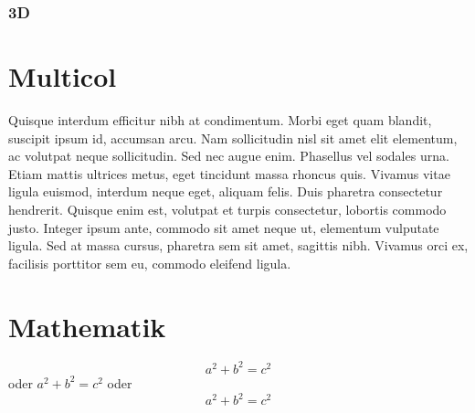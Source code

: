 \documentclass[a4paper, ngerman, oneside, 10pt]{article}
\begin{document}


\subsubsection{3D}

\newpage
\section{Multicol}
\begin{multicols}{2}
	Quisque interdum efficitur nibh at condimentum. Morbi eget quam blandit, suscipit ipsum id, accumsan arcu. Nam sollicitudin nisl sit amet elit elementum, ac volutpat neque sollicitudin. Sed nec augue enim. Phasellus vel sodales urna. Etiam mattis ultrices metus, eget tincidunt massa rhoncus quis. Vivamus vitae ligula euismod, interdum neque eget, aliquam felis. Duis pharetra consectetur hendrerit. Quisque enim est, volutpat et turpis consectetur, lobortis commodo justo. Integer ipsum ante, commodo sit amet neque ut, elementum vulputate ligula. Sed at massa cursus, pharetra sem sit amet, sagittis nibh. Vivamus orci ex, facilisis porttitor sem eu, commodo eleifend ligula.
\end{multicols}

\section{Mathematik}
\begin{equation}
	a^{2}+b^{2}=c^{2}
	\label{equ:Pytagoras}
\end{equation}
oder
$a^{2}+b^{2}=c^{2}$ oder
$$a^{2}+b^{2}=c^{2}$$
\end{document}
